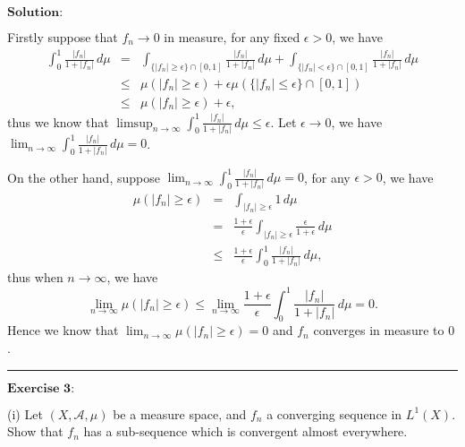 \documentclass[12pt]{article}
\begin{document}
\vspace{8pt}
$\textbf{Solution:}$

Firstly suppose that $f_{n} \to 0$ in measure, for any fixed $\epsilon > 0$, we have
\begin{eqnarray*}
    \int_{0}^{1} \frac{|f_{n}|}{1 + |f_{n}|} \, d \mu & = & \int_{\{|f_{n}| \geq \epsilon\} \cap [0, 1]}^{} \frac{|f_{n}|}{1 + |f_{n}|} \, d \mu + \int_{\{|f_{n}| < \epsilon\} \cap [0, 1]}^{} \frac{|f_{n}|}{1 + |f_{n}|} \, d \mu \\
    & \leq & \mu({|f_{n}| \geq \epsilon}) + \epsilon \mu(\{|f_{n}| \leq \epsilon\} \cap [0, 1]) \\
    & \leq & \mu({|f_{n}| \geq \epsilon}) + \epsilon,
\end{eqnarray*}
thus we know that $\limsup_{n \to \infty} \int_{0}^{1} \frac{|f_{n}|}{1 + |f_{n}|} \, d \mu \leq \epsilon $. Let $\epsilon \to 0$, we have $\lim_{n \to \infty} \int_{0}^{1} \frac{|f_{n}|}{1 + |f_{n}|} \, d \mu = 0$.

On the other hand, suppose $\lim_{n \to \infty} \int_{0}^{1} \frac{|f_{n}|}{1 + |f_{n}|} \, d \mu = 0$, for any $\epsilon > 0$, we have
\begin{eqnarray*}
     \mu(|f_{n}| \geq \epsilon) & = & \int_{|f_{n}| \geq \epsilon}^{} 1 \, d \mu  \\
     & = & \frac{1 + \epsilon}{\epsilon} \int_{|f_{n}| \geq \epsilon}^{} \frac{\epsilon}{1 + \epsilon} \, d \mu \\
    & \leq & \frac{1 + \epsilon}{\epsilon} \int_{0}^{1} \frac{|f_{n}|}{1 + |f_{n}|} \, d \mu,
\end{eqnarray*}
thus when $n \to \infty$, we have
\begin{equation*}
    \lim_{n \to \infty} \mu(|f_{n}| \geq \epsilon) \leq  \lim_{n \to \infty} \frac{1 + \epsilon}{\epsilon} \int_{0}^{1} \frac{|f_{n}|}{1 + |f_{n}|} \, d \mu = 0.
\end{equation*}
Hence we know that $\lim_{n \to \infty} \mu(|f_{n}| \geq \epsilon) = 0$ and $f_{n}$ converges in measure to $0$.


\noindent\rule[0.25\baselineskip]{\textwidth}{0.5pt}

\vspace{8pt}

$\textbf{Exercise 3:}$

(i) Let $(X, \mathcal{A}, \mu)$ be a measure space, and $f_{n}$ a converging sequence in $L^{1}(X)$. Show that $f_{n}$ has a sub-sequence which is convergent almost everywhere.
\vspace{8pt}
\end{document}
